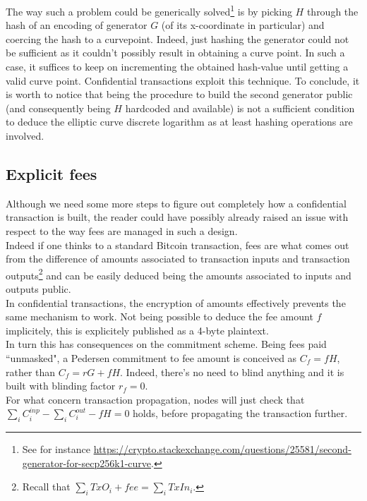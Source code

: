 The way such a problem could be generically solved\footnote{See for instance \url{https://crypto.stackexchange.com/questions/25581/second-generator-for-secp256k1-curve}.} is by picking $H$ through the hash of an encoding of generator $G$ (of its x-coordinate in particular) and coercing the hash to a curvepoint. Indeed, just hashing the generator could not be sufficient as it couldn't possibly result in obtaining a curve point. In such a case, it suffices to keep on incrementing the obtained hash-value until getting a valid curve point. Confidential transactions exploit this technique. To conclude, it is worth to notice that being the procedure to build the second generator public (and consequently being $H$ hardcoded and available) is not a sufficient condition to deduce the elliptic curve discrete logarithm as at least hashing operations are involved.

\subsection{Explicit fees}
\label{sec::explicit_fees}
Although we need some more steps to figure out completely how a confidential transaction is built, the reader could have possibly already raised an issue with respect to the way fees are managed in such a design.\\
Indeed if one thinks to a standard Bitcoin transaction, fees are what comes out from the difference of amounts associated to transaction inputs and transaction outputs\footnote{Recall that $\sum_i TxO_i + fee = \sum_i TxIn_i$.} and can be easily deduced being the amounts associated to inputs and outputs public.\\
In confidential transactions, the encryption of amounts effectively prevents the same mechanism to work. Not being possible to deduce the fee amount $f$ implicitely, this is explicitely published as a 4-byte plaintext.\\
In turn this has consequences on the commitment scheme. Being fees paid ``unmasked", a Pedersen commitment to fee amount is conceived as $C_f = fH$, rather than $C_f = rG + fH$. Indeed, there's no need to blind anything and it is built with blinding factor $r_f=0$.\\
For what concern transaction propagation, nodes will just check that $\sum_i C_i^{inp} - \sum_i C_i^{out} - fH = 0$ holds, before propagating the transaction further.

